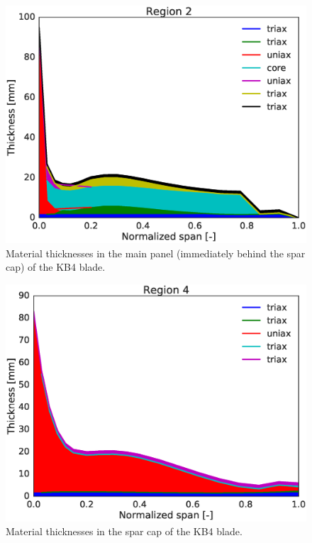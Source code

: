 \begin{figure}[pth]
\begin{center}
	\includegraphics[width=.85\linewidth]{figures/KB4_laminate_layers_r02.eps}
\end{center}
\caption{Material thicknesses in the main panel (immediately behind the spar cap) of the KB4 blade.}
\label{fig:KB4matstackr02}
\end{figure}

\begin{figure}[pth]
\begin{center}
	\includegraphics[width=.85\linewidth]{figures/KB4_laminate_layers_r04.eps}
\end{center}
\caption{Material thicknesses in the spar cap of the KB4 blade.}
\label{fig:KB4matstackr04}
\end{figure}

